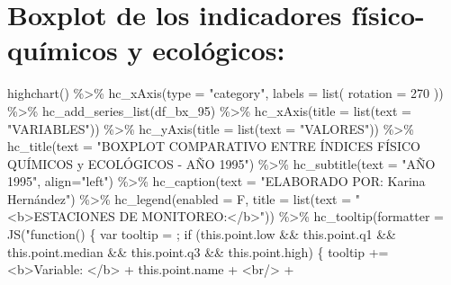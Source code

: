 \documentclass[
  10pt,
  letterpaper,
  DIV=11,
  numbers=noendperiod]{scrreprt}
\newenvironment{Shaded}{\begin{snugshade}}{\end{snugshade}}
\newcommand{\AttributeTok}[1]{\textcolor[rgb]{0.40,0.45,0.13}{#1}}
\newcommand{\DecValTok}[1]{\textcolor[rgb]{0.68,0.00,0.00}{#1}}
\newcommand{\FunctionTok}[1]{\textcolor[rgb]{0.28,0.35,0.67}{#1}}
\newcommand{\NormalTok}[1]{\textcolor[rgb]{0.00,0.23,0.31}{#1}}
\newcommand{\SpecialCharTok}[1]{\textcolor[rgb]{0.37,0.37,0.37}{#1}}
\newcommand{\StringTok}[1]{\textcolor[rgb]{0.13,0.47,0.30}{#1}}
\begin{document}
\hypertarget{boxplot-de-los-indicadores-fuxedsico-quuxedmicos-y-ecoluxf3gicos}{%
\section{Boxplot de los indicadores físico-químicos y
ecológicos:}\label{boxplot-de-los-indicadores-fuxedsico-quuxedmicos-y-ecoluxf3gicos}}

\begin{Shaded}
\begin{Highlighting}[numbers=left,,]
\FunctionTok{highchart}\NormalTok{() }\SpecialCharTok{\%\textgreater{}\%}
    \FunctionTok{hc\_xAxis}\NormalTok{(}\AttributeTok{type =} \StringTok{"category"}\NormalTok{,}
             \AttributeTok{labels =} \FunctionTok{list}\NormalTok{(}
                 \AttributeTok{rotation =} \DecValTok{270}
\NormalTok{             )) }\SpecialCharTok{\%\textgreater{}\%}
    \FunctionTok{hc\_add\_series\_list}\NormalTok{(df\_bx\_95) }\SpecialCharTok{\%\textgreater{}\%}
    \FunctionTok{hc\_xAxis}\NormalTok{(}\AttributeTok{title =} \FunctionTok{list}\NormalTok{(}\AttributeTok{text =} \StringTok{"VARIABLES"}\NormalTok{)) }\SpecialCharTok{\%\textgreater{}\%}
    \FunctionTok{hc\_yAxis}\NormalTok{(}\AttributeTok{title =} \FunctionTok{list}\NormalTok{(}\AttributeTok{text =} \StringTok{"VALORES"}\NormalTok{)) }\SpecialCharTok{\%\textgreater{}\%}
    \FunctionTok{hc\_title}\NormalTok{(}\AttributeTok{text =} \StringTok{"BOXPLOT COMPARATIVO ENTRE ÍNDICES FÍSICO QUÍMICOS y ECOLÓGICOS {-} AÑO 1995"}\NormalTok{) }\SpecialCharTok{\%\textgreater{}\%}
    \FunctionTok{hc\_subtitle}\NormalTok{(}\AttributeTok{text =} \StringTok{"AÑO 1995"}\NormalTok{, }\AttributeTok{align=}\StringTok{"left"}\NormalTok{) }\SpecialCharTok{\%\textgreater{}\%}
    \FunctionTok{hc\_caption}\NormalTok{(}\AttributeTok{text =} \StringTok{"ELABORADO POR: Karina Hernández"}\NormalTok{) }\SpecialCharTok{\%\textgreater{}\%}
    \FunctionTok{hc\_legend}\NormalTok{(}\AttributeTok{enabled =}\NormalTok{ F, }\AttributeTok{title =} \FunctionTok{list}\NormalTok{(}\AttributeTok{text =} \StringTok{"\textless{}b\textgreater{}ESTACIONES DE MONITOREO:\textless{}/b\textgreater{}"}\NormalTok{)) }\SpecialCharTok{\%\textgreater{}\%}
    \FunctionTok{hc\_tooltip}\NormalTok{(}\AttributeTok{formatter =} \FunctionTok{JS}\NormalTok{(}\StringTok{"function() \{}
\StringTok{    var tooltip = \textquotesingle{}\textquotesingle{};}
\StringTok{    if (this.point.low \&\& this.point.q1 \&\& this.point.median \&\& this.point.q3 \&\& this.point.high) \{}
\StringTok{        tooltip += \textquotesingle{}\textless{}b\textgreater{}Variable: \textless{}/b\textgreater{}\textquotesingle{} + this.point.name + \textquotesingle{}\textless{}br/\textgreater{}\textquotesingle{} +}

\end{Highlighting}
\end{Shaded}
\end{document}
